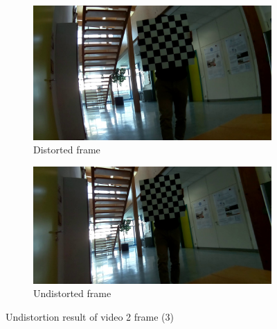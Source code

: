 \begin{figure}[h]
    \centering
    \begin{subfigure}[b]{0.48\textwidth}
        \centering
        \includegraphics[width=\textwidth]{figures/addl/img13_0.jpg}
        \caption{Distorted frame}
    \end{subfigure}
    \hfill
    \begin{subfigure}[b]{0.48\textwidth}
        \centering
        \includegraphics[width=\textwidth]{figures/addl/img13_5.jpg}
        \caption{Undistorted frame}
    \end{subfigure}
    \caption{Undistortion result of video 2 frame (3)}
    \label{fig:dist_2a3}
\end{figure}

